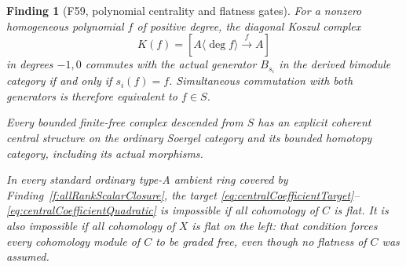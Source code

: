 \documentclass[11pt,a4paper]{article}
\newcommand{\fid}[1]{\textsf{#1}}\newcommand{\gate}[1]{\textsf{#1}}
\theoremstyle{named}\newtheorem{finding}{Finding}[section]
\theoremstyle{definition}\newtheorem{definition}[finding]{Definition}
\theoremstyle{remark}\newtheorem{remark}[finding]{Remark}
\begin{document}
\begin{finding}[\fid{F59}, polynomial centrality and flatness gates]
\label{f:centralPolynomialCoefficientGate}
For a nonzero homogeneous polynomial \(f\) of positive
degree, the diagonal Koszul complex
\[
 K(f)=[A\langle\deg f\rangle\xrightarrow{f}A]
\]
in degrees \(-1,0\) commutes with the actual generator
\(B_{s_i}\) in the derived bimodule category if and
only if \(s_i(f)=f\). Simultaneous commutation with
both generators is therefore equivalent to \(f\in S\).

Every bounded finite-free complex descended from \(S\)
has an explicit coherent central structure on the
ordinary Soergel category and its bounded homotopy
category, including its actual morphisms.

In every standard ordinary type-A ambient ring covered
by Finding~\ref{f:allRankScalarClosure}, the target
\eqref{eq:centralCoefficientTarget}--\eqref{eq:centralCoefficientQuadratic}
is impossible if all cohomology of \(C\) is flat.
It is also impossible if all cohomology of \(X\) is
flat on the left: that condition forces every
cohomology module of \(C\) to be graded free, even
though no flatness of \(C\) was assumed.
\end{finding}
\end{document}
